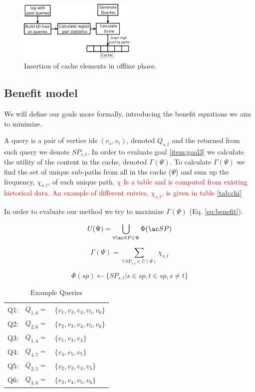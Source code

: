 \begin{figure}[bht]
  \center
        \includegraphics[width=0.5\textwidth]{figures/fillcache}
        \caption{Insertion of cache elements in offline phase.}
  \label{fig:fillcache}
\end{figure}


\subsection{Benefit model}

We will define our goals more formally, introducing the benefit equations we aim to minimize.

A query is a pair of vertice ids $(v_s, v_t)$, denoted $Q_{s,t}$ and the \spath returned from such query we denote $SP_{s,t}$. 
In order to evaluate goal \ref{item:goal3} we calculate the utility of the content in the cache, denoted $\Gamma(\Psi)$. To calculate $\Gamma(\Psi)$ we find the set of unique sub-paths from all \spaths in the cache ($\Psi$) and sum up the frequency, $\chi_{s,t}$, of each unique path.
\textcolor{red}{$\chi$ Is a table and is computed from existing historical data. An example of different entries, $\chi_{s,t}$, is given in table \ref{tab:chi}}

In order to evaluate our method we try to maximize $\Gamma(\Psi)$ (Eq. \ref{eq:benefit}).


\begin{equation} \label{eq:upsi}
 U(\Psi) = \bigcup\limits_{\forall \spath \in \Psi} \Phi(\spath)
\end{equation}

\begin{equation} \label{eq:benefit}
\Gamma(\Psi) = \sum\limits_{\forall SP_{s,t} \in U(\Psi)} \chi_{s,t}
\end{equation}

\begin{equation} \label{eq:phi}
\Phi(sp) \leftarrow \{ SP_{s,t} | s \in sp, t \in sp, s \neq t\}
\end{equation}


\begin{table}
\begin{tabular}{l l p{}}
Q1:	&	$Q_{1,6} =$ 	& $\{v_1,v_3,v_4,v_5,v_6\}$\\
Q2:	&	$Q_{2,6} =$ 	& $\{v_2,v_3,v_4,v_5,v_6\}$ \\
Q3:	&	$Q_{1,4} =$ 	& $\{v_1,v_3,v_4\}$ \\
Q4:	&	$Q_{4,7} =$ 	& $\{v_4,v_5,v_7\}$ \\
Q5:	&	$Q_{2,5} =$ 	& $\{v_2,v_3,v_4,v_5\}$ \\
Q6:	&	$Q_{3,6} =$ 	& $\{v_3,v_4,v_5,v_6\}$ \\
\end{tabular}
\caption{Example Queries}
\label{tab:queries}
\end{table}

